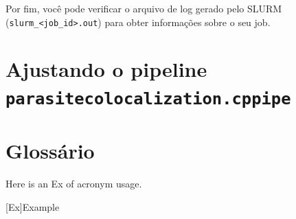 \documentclass{article}
\begin{document}
Por fim, você pode verificar o arquivo de log gerado pelo SLURM (\texttt{slurm\_<job\_id>.out}) para obter informações sobre o seu job.

\section{Ajustando o pipeline \texttt{parasitecolocalization.cppipe}}

\section{Glossário}

Here is an \ac{Ex} of acronym usage.

\begin{acronym} \itemsep=-8pt
  [Ex]{Example}
\end{acronym}

\printbibliography





\end{document}
